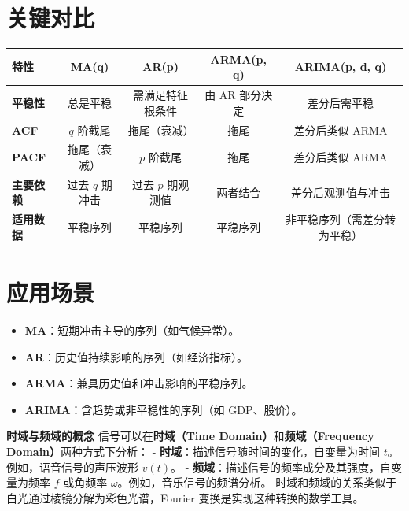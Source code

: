\section*{关键对比}

\begin{table}[h!]
\centering
\begin{tabular}{|l|c|c|c|c|}
\hline
\textbf{特性} & \textbf{MA(q)} & \textbf{AR(p)} & \textbf{ARMA(p, q)} & \textbf{ARIMA(p, d, q)} \\ \hline
\textbf{平稳性} & 总是平稳 & 需满足特征根条件 & 由 AR 部分决定 & 差分后需平稳 \\ \hline
\textbf{ACF} & \(q\) 阶截尾 & 拖尾（衰减） & 拖尾 & 差分后类似 ARMA \\ \hline
\textbf{PACF} & 拖尾（衰减） & \(p\) 阶截尾 & 拖尾 & 差分后类似 ARMA \\ \hline
\textbf{主要依赖} & 过去 \(q\) 期冲击 & 过去 \(p\) 期观测值 & 两者结合 & 差分后观测值与冲击 \\ \hline
\textbf{适用数据} & 平稳序列 & 平稳序列 & 平稳序列 & 非平稳序列（需差分转为平稳） \\ \hline
\end{tabular}
\end{table}

\section*{应用场景}
\begin{itemize}
    \item \textbf{MA}：短期冲击主导的序列（如气候异常）。
    \item \textbf{AR}：历史值持续影响的序列（如经济指标）。
    \item \textbf{ARMA}：兼具历史值和冲击影响的平稳序列。
    \item \textbf{ARIMA}：含趋势或非平稳性的序列（如 GDP、股价）。
\end{itemize}






\textbf{时域与频域的概念}  
信号可以在\textbf{时域（Time Domain）}和\textbf{频域（Frequency Domain）}两种方式下分析：  
- \textbf{时域}：描述信号随时间的变化，自变量为时间 $t$。例如，语音信号的声压波形 $v(t)$。  
- \textbf{频域}：描述信号的频率成分及其强度，自变量为频率 $f$ 或角频率 $\omega$。例如，音乐信号的频谱分析。  
时域和频域的关系类似于白光通过棱镜分解为彩色光谱，Fourier 变换是实现这种转换的数学工具。

